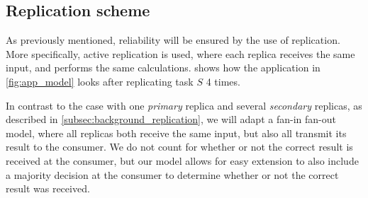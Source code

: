 \documentclass{cslthse-msc}
\begin{document}

\subsection{Replication scheme} \label{subsec:design_repl_scheme}
As previously mentioned, reliability will be ensured by the use of replication. More specifically, active replication is used, where each replica receives the same input, and performs the same calculations.  shows how the application in \cref{fig:app_model} looks after replicating task $S$ 4 times.

In contrast to the case with one \emph{primary} replica and several \emph{secondary} replicas, as described in \cref{subsec:background_replication}, we will adapt a fan-in fan-out model, where all replicas both receive the same input, but also all transmit its result to the consumer. We do not count for whether or not the correct result is received at the consumer, but our model allows for easy extension to also include a majority decision at the consumer to determine whether or not the correct result was received. %
\end{document}
